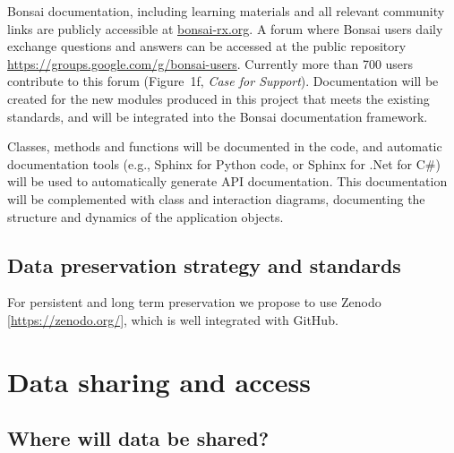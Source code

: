 \documentclass[a4paper,11pt]{article}
\renewcommand{\footnote}[1]{ [#1]}
\begin{document}

Bonsai documentation, including learning materials and all relevant community
links are publicly accessible at \url{bonsai-rx.org}. A forum where Bonsai
users daily exchange questions and answers can be accessed at the public
repository \url{https://groups.google.com/g/bonsai-users}. Currently more than
700 users contribute to this forum (Figure~1f, \emph{Case for Support}).
Documentation will be created for the new modules produced in this project that
meets the existing standards, and will be integrated into the Bonsai
documentation framework.

Classes, methods and functions will be documented in the code, and automatic
documentation tools (e.g., Sphinx for Python code, or Sphinx for .Net for C\#)
will be used to automatically generate API documentation. This documentation
will be complemented with class and interaction diagrams, documenting the
structure and dynamics of the application objects.

\subsection{Data preservation strategy and standards}


For persistent and long term preservation we propose to use
Zenodo\footnote{\url{https://zenodo.org/}}, which is well integrated with
GitHub.

\section{Data sharing and access}
\subsection{Where will data be shared?}
\end{document}
